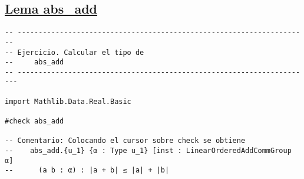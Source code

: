 \subsection{\href{./src/Basicos/abs\_add.lean}{Lema abs\_add}}
\label{sec:org9dc9c9e}
\begin{verbatim}
-- ---------------------------------------------------------------------
-- Ejercicio. Calcular el tipo de
--     abs_add
-- ----------------------------------------------------------------------

import Mathlib.Data.Real.Basic

#check abs_add

-- Comentario: Colocando el cursor sobre check se obtiene
--    abs_add.{u_1} {α : Type u_1} [inst : LinearOrderedAddCommGroup α]
--      (a b : α) : |a + b| ≤ |a| + |b|
\end{verbatim}

